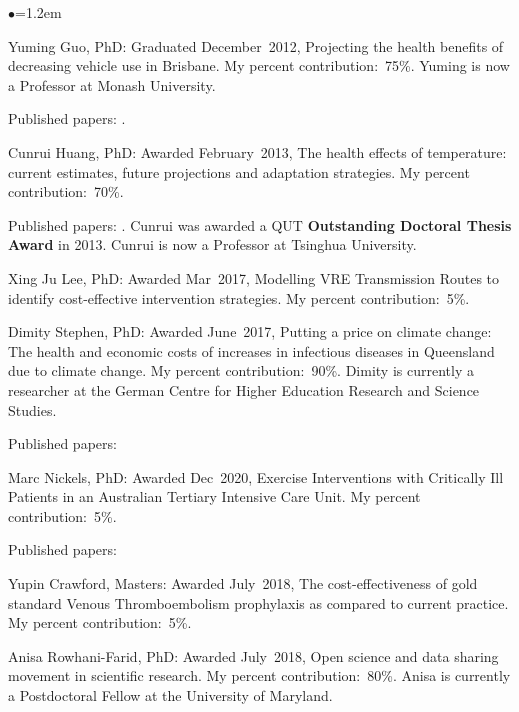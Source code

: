 \documentclass[a4paper,11pt]{article}
\renewcommand{\labelitemi}{$\bullet$}
\begin{document}
\begin{raggedright}
\begin{list}{\labelitemi}{\leftmargin=1.2em}
\item Yuming Guo, PhD: Graduated December~2012, Projecting the health benefits of decreasing vehicle use in Brisbane. My percent contribution:~75\%. Yuming is now a Professor at Monash University.

Published papers: . %

\item Cunrui Huang, PhD: Awarded February~2013, The health effects of temperature: current estimates, future projections and adaptation strategies. My percent contribution:~70\%.

Published papers: . Cunrui was awarded a QUT \textbf{Outstanding Doctoral Thesis Award} in 2013. Cunrui is now a Professor at Tsinghua University.

\item Xing Ju Lee, PhD: Awarded Mar~2017, Modelling VRE Transmission Routes to identify cost-effective intervention strategies. My percent contribution:~5\%.

\item Dimity Stephen, PhD: Awarded June~2017, Putting a price on climate change: The health and economic costs of increases in infectious diseases in Queensland due to climate change. My percent contribution:~90\%. Dimity is currently a researcher at the German Centre for Higher Education Research and Science Studies.

Published papers: 

\item Marc Nickels, PhD: Awarded Dec~2020, Exercise Interventions with Critically Ill Patients in an Australian Tertiary Intensive Care Unit. My percent contribution:~5\%.

Published papers: 

\item Yupin Crawford, Masters: Awarded July~2018, The cost-effectiveness of gold standard Venous Thromboembolism prophylaxis as compared to current practice. My percent contribution:~5\%.

\item Anisa Rowhani-Farid, PhD: Awarded July~2018, Open science and data sharing movement in scientific research. My percent contribution:~80\%. Anisa is currently a Postdoctoral Fellow at the University of Maryland.


\end{list}
\end{raggedright}
\end{document}
